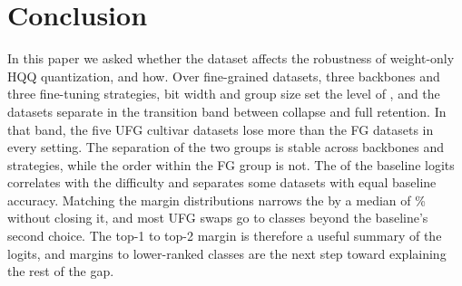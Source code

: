 \section{Conclusion}
\label{sec:conclusion}

In this paper we asked whether the dataset affects the robustness of weight-only HQQ quantization, and how.
Over  fine-grained datasets, three backbones and three fine-tuning strategies, bit width and group size set the level of , and the datasets separate in the transition band between collapse and full retention.
In that band, the five UFG cultivar datasets lose more than the FG datasets in every setting.
The separation of the two groups is stable across backbones and strategies, while the order within the FG group is not.
The  of the baseline logits correlates with the difficulty and separates some datasets with equal baseline accuracy.
Matching the margin distributions narrows the  by a median of \% without closing it, and most UFG swaps go to classes beyond the baseline's second choice.
The top-1 to top-2 margin is therefore a useful summary of the logits, and margins to lower-ranked classes are the next step toward explaining the rest of the gap.
